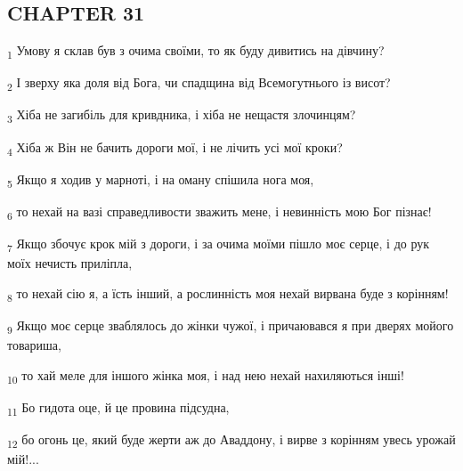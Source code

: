 \subsection{CHAPTER 31}
\begin{tcolorbox}
\textsubscript{1} Умову я склав був з очима своїми, то як буду дивитись на дівчину?
\end{tcolorbox}
\begin{tcolorbox}
\textsubscript{2} І зверху яка доля від Бога, чи спадщина від Всемогутнього із висот?
\end{tcolorbox}
\begin{tcolorbox}
\textsubscript{3} Хіба не загибіль для кривдника, і хіба не нещастя злочинцям?
\end{tcolorbox}
\begin{tcolorbox}
\textsubscript{4} Хіба ж Він не бачить дороги мої, і не лічить усі мої кроки?
\end{tcolorbox}
\begin{tcolorbox}
\textsubscript{5} Якщо я ходив у марноті, і на оману спішила нога моя,
\end{tcolorbox}
\begin{tcolorbox}
\textsubscript{6} то нехай на вазі справедливости зважить мене, і невинність мою Бог пізнає!
\end{tcolorbox}
\begin{tcolorbox}
\textsubscript{7} Якщо збочує крок мій з дороги, і за очима моїми пішло моє серце, і до рук моїх нечисть приліпла,
\end{tcolorbox}
\begin{tcolorbox}
\textsubscript{8} то нехай сію я, а їсть інший, а рослинність моя нехай вирвана буде з корінням!
\end{tcolorbox}
\begin{tcolorbox}
\textsubscript{9} Якщо моє серце зваблялось до жінки чужої, і причаювався я при дверях мойого товариша,
\end{tcolorbox}
\begin{tcolorbox}
\textsubscript{10} то хай меле для іншого жінка моя, і над нею нехай нахиляються інші!
\end{tcolorbox}
\begin{tcolorbox}
\textsubscript{11} Бо гидота оце, й це провина підсудна,
\end{tcolorbox}
\begin{tcolorbox}
\textsubscript{12} бо огонь це, який буде жерти аж до Аваддону, і вирве з корінням увесь урожай мій!...
\end{tcolorbox}
